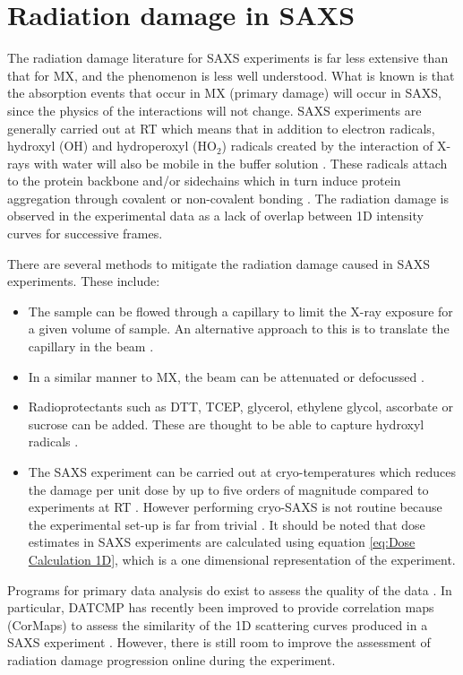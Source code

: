 \section{Radiation damage in SAXS}
\label{sec:Radiation damage in SAXS}
    The radiation damage literature for SAXS experiments is far less extensive than that for MX, and the phenomenon is less well understood.
    What is known is that the absorption events that occur in MX (primary damage) will occur in SAXS, since the physics of the interactions will not change.
    SAXS experiments are generally carried out at RT which means that in addition to electron radicals, hydroxyl (OH) and hydroperoxyl (HO$_2$) radicals created by the interaction of X-rays with water will also be mobile in the buffer solution \cite{jeffries2015limiting,garrison1987reaction}.
    These radicals attach to the protein backbone and/or sidechains which in turn induce protein aggregation through covalent or non-covalent bonding \cite{kuwamoto2004radiation}.
    The radiation damage is observed in the experimental data as a lack of overlap between 1D intensity curves for successive frames.

    There are several methods to mitigate the radiation damage caused in SAXS experiments. These include:
    \begin{itemize}
        \item The sample can be flowed through a capillary to limit the X-ray exposure for a given volume of sample.
        An alternative approach to this is to translate the capillary in the beam \cite{jeffries2015limiting}.
        \item In a similar manner to MX, the beam can be attenuated or defocussed \cite{jeffries2015limiting}.
        \item Radioprotectants such as DTT, TCEP, glycerol, ethylene glycol, ascorbate or sucrose can be added.
        These are thought to be able to capture hydroxyl radicals \cite{grishaev2012sample}.
        \item The SAXS experiment can be carried out at cryo-temperatures which reduces the damage per unit dose by up to five orders of magnitude compared to experiments at RT \cite{meisburger2013breaking}.
        However performing cryo-SAXS is not routine because the experimental set-up is far from trivial \cite{jeffries2015limiting}.
        It should be noted that dose estimates in SAXS experiments are calculated using equation \ref{eq:Dose Calculation 1D}, which is a one dimensional representation of the experiment.
    \end{itemize}

    Programs for primary data analysis do exist to assess the quality of the data \cite{petoukhov2012new}. In particular, DATCMP has recently been improved to provide correlation maps (CorMaps) to assess the similarity of the 1D scattering curves produced in a SAXS experiment \cite{franke2015correlation}. However, there is still room to improve the assessment of radiation damage progression online during the experiment.
